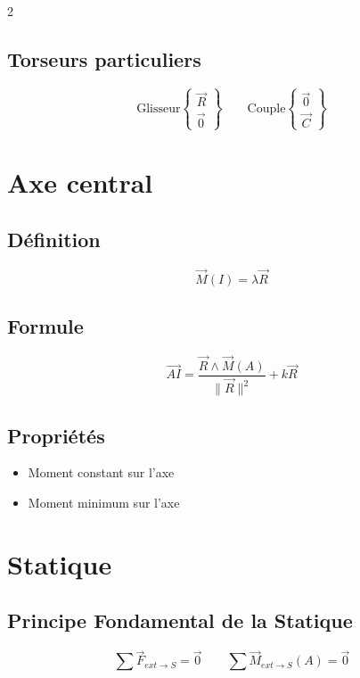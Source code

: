 \documentclass[10pt,a4paper]{article}
\renewcommand{\vec}{\overrightarrow}
\begin{document}
\begin{multicols}{2}
        \subsection*{Torseurs particuliers}
            $$ \text{Glisseur}
            \begin{Bmatrix}
                \vec R \\
                \vec 0
            \end{Bmatrix}
            \qquad
            \text{Couple}
            \begin{Bmatrix}
                \vec 0 \\
                \vec C
            \end{Bmatrix}
            $$


    \section{Axe central}

        \subsection*{Définition}
        \[
        \vec M(I) = \lambda \vec R
        \]

        \subsection*{Formule}
        \[
        \vec{AI} =
        \frac{\vec R \wedge \vec M(A)}{\|\vec R\|^2}
        + k \vec R
        \]

        \subsection*{Propriétés}
        \begin{itemize}
            \item Moment constant sur l'axe
            \item Moment minimum sur l'axe
        \end{itemize}

    \section{Statique}

        \subsection*{Principe Fondamental de la Statique}
        \[
        \sum \vec F_{ext \rightarrow S} = \vec 0
        \qquad
        \sum \vec M_{ext \rightarrow S}(A) = \vec 0
        \]



\end{multicols}
\end{document}
